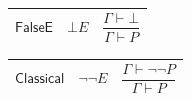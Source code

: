 \documentclass[11pt]{amsart}
\newlength{\FTCThreeColumnBody}
\begin{document}
{\noindent
\begin{tabular}{|@{}>{\centering\arraybackslash}m{0.176056\FTCThreeColumnBody}|>{\centering\arraybackslash}m{0.225352\FTCThreeColumnBody}|>{\centering\arraybackslash}m{0.598591\FTCThreeColumnBody}|}\hline
\hypertarget{rule:FalseE}{$\displaystyle \textsf{FalseE}$} & $\displaystyle \bot E$ & \rule[-3.3ex]{0pt}{7.8ex}$\displaystyle \dfrac{\Gamma\vdash\bot}{\Gamma\vdash P}$\\ \hline
\end{tabular}%
\par\setlength{\parskip}{0pt}\nointerlineskip
\noindent
\begin{tabular}{|@{}>{\centering\arraybackslash}m{0.176056\FTCThreeColumnBody}|>{\centering\arraybackslash}m{0.225352\FTCThreeColumnBody}|>{\centering\arraybackslash}m{0.598591\FTCThreeColumnBody}|}\hline
\hypertarget{rule:Classical}{$\displaystyle \textsf{Classical}$} & $\displaystyle \neg\neg E$ & \rule[-3.3ex]{0pt}{7.8ex}$\displaystyle \dfrac{\Gamma\vdash\neg\neg P}{\Gamma\vdash P}$\\ \hline
\end{tabular}%
\par
}
\end{document}
